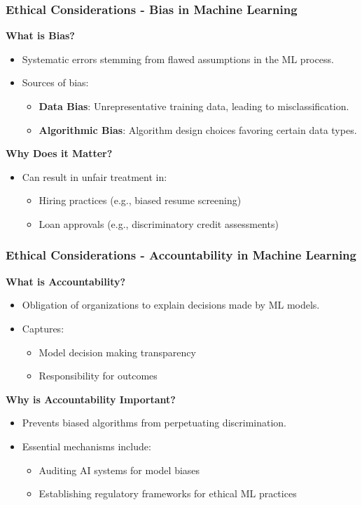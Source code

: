\documentclass[aspectratio=169]{beamer}
\begin{document}
\begin{frame}[fragile]
    \frametitle{Ethical Considerations - Bias in Machine Learning}
    
    \textbf{What is Bias?}
    \begin{itemize}
        \item Systematic errors stemming from flawed assumptions in the ML process.
        \item Sources of bias:
        \begin{itemize}
            \item \textbf{Data Bias}: Unrepresentative training data, leading to misclassification.
            \item \textbf{Algorithmic Bias}: Algorithm design choices favoring certain data types.
        \end{itemize}
    \end{itemize}

    \textbf{Why Does it Matter?}
    \begin{itemize}
        \item Can result in unfair treatment in:
        \begin{itemize}
            \item Hiring practices (e.g., biased resume screening)
            \item Loan approvals (e.g., discriminatory credit assessments)
        \end{itemize}
    \end{itemize}
\end{frame}

\begin{frame}[fragile]
    \frametitle{Ethical Considerations - Accountability in Machine Learning}

    \textbf{What is Accountability?}
    \begin{itemize}
        \item Obligation of organizations to explain decisions made by ML models.
        \item Captures:
        \begin{itemize}
            \item Model decision making transparency
            \item Responsibility for outcomes
        \end{itemize}
    \end{itemize}

    \textbf{Why is Accountability Important?}
    \begin{itemize}
        \item Prevents biased algorithms from perpetuating discrimination.
        \item Essential mechanisms include:
        \begin{itemize}
            \item Auditing AI systems for model biases
            \item Establishing regulatory frameworks for ethical ML practices
        \end{itemize}
    \end{itemize}
\end{frame}
\end{document}
